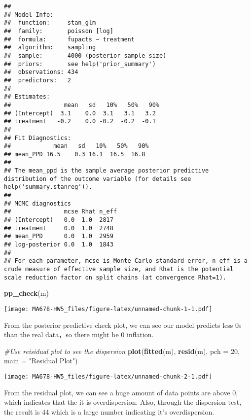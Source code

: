 \documentclass[
]{article}
\newenvironment{Shaded}{\begin{snugshade}}{\end{snugshade}}
\newcommand{\AttributeTok}[1]{\textcolor[rgb]{0.13,0.29,0.53}{#1}}
\newcommand{\CommentTok}[1]{\textcolor[rgb]{0.56,0.35,0.01}{\textit{#1}}}
\newcommand{\DecValTok}[1]{\textcolor[rgb]{0.00,0.00,0.81}{#1}}
\newcommand{\FunctionTok}[1]{\textcolor[rgb]{0.13,0.29,0.53}{\textbf{#1}}}
\newcommand{\NormalTok}[1]{#1}
\newcommand{\StringTok}[1]{\textcolor[rgb]{0.31,0.60,0.02}{#1}}
\begin{document}
\begin{verbatim}
## 
## Model Info:
##  function:     stan_glm
##  family:       poisson [log]
##  formula:      fupacts ~ treatment
##  algorithm:    sampling
##  sample:       4000 (posterior sample size)
##  priors:       see help('prior_summary')
##  observations: 434
##  predictors:   2
## 
## Estimates:
##               mean   sd   10%   50%   90%
## (Intercept)  3.1    0.0  3.1   3.1   3.2 
## treatment   -0.2    0.0 -0.2  -0.2  -0.1 
## 
## Fit Diagnostics:
##            mean   sd   10%   50%   90%
## mean_PPD 16.5    0.3 16.1  16.5  16.8 
## 
## The mean_ppd is the sample average posterior predictive distribution of the outcome variable (for details see help('summary.stanreg')).
## 
## MCMC diagnostics
##               mcse Rhat n_eff
## (Intercept)   0.0  1.0  2817 
## treatment     0.0  1.0  2748 
## mean_PPD      0.0  1.0  2959 
## log-posterior 0.0  1.0  1843 
## 
## For each parameter, mcse is Monte Carlo standard error, n_eff is a crude measure of effective sample size, and Rhat is the potential scale reduction factor on split chains (at convergence Rhat=1).
\end{verbatim}

\begin{Shaded}
\begin{Highlighting}[]
\FunctionTok{pp\_check}\NormalTok{(m)}
\end{Highlighting}
\end{Shaded}

\texttt{[image: MA678-HW5\_files/figure-latex/unnamed-chunk-1-1.pdf]}

From the posterior predictive check plot, we can see our model predicts
less 0s than the real data，so there might be 0 inflation.

\begin{Shaded}
\begin{Highlighting}[]
\CommentTok{\#Use reisidual plot to see the dispersion}
\FunctionTok{plot}\NormalTok{(}\FunctionTok{fitted}\NormalTok{(m), }\FunctionTok{resid}\NormalTok{(m), }\AttributeTok{pch =} \DecValTok{20}\NormalTok{, }\AttributeTok{main =} \StringTok{"Residual Plot"}\NormalTok{)}
\end{Highlighting}
\end{Shaded}

\texttt{[image: MA678-HW5\_files/figure-latex/unnamed-chunk-2-1.pdf]}

From the residual plot, we can see a huge amount of data points are
above 0, which indicates that the it is overdispersion. Also, through
the dispersion test, the result is 44 which is a large number indicating
it's overdispersion.
\end{document}
